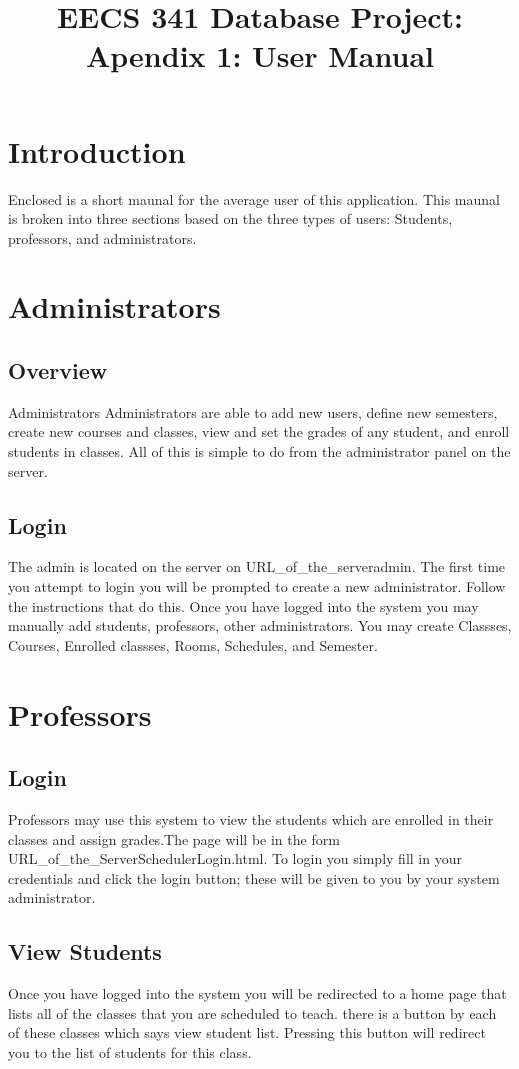 \documentclass[11pt,oneside,a4paper]{article}
\title{EECS 341 Database Project: Apendix 1: User Manual}
\begin{document}
\maketitle
\section{Introduction}
Enclosed is a short maunal for the average user of this application.  
This maunal is broken into three sections based on the three types of 
users: Students, professors, and administrators.
\section{Administrators}
\subsection{Overview}
Administrators Administrators are able to add new users, define new semesters, create new
courses and classes, view and set the grades of any student, and enroll students in
classes.  All of this is simple to do from the administrator panel on the server.  
\subsection{Login}
The admin is located on the server on URL\_of\_the\_server\/admin. The first time you attempt
to login you will be prompted to create a new administrator.  Follow the instructions that 
do this.  Once you have logged into the system you may manually add students, professors, 
other administrators.  You may create Classses, Courses, Enrolled classses, Rooms, 
Schedules, and Semester.
\section{Professors}
\subsection{Login}
Professors may use this system to view the students which are enrolled 
in their classes and assign grades.The page will be in the form URL\_of\_the\_Server\/Scheduler\/Login.html. 
 To login you simply fill in your credentials and click the login button; these will be 
given to you by your system administrator.  
\subsection{View Students}
Once you have logged into the system you will be redirected to a home page that lists all 
of the classes that you are scheduled to teach. there is a button by each of these classes
 which says view student list.  Pressing this button will redirect you to the list of 
students for this class.
\end{document}
